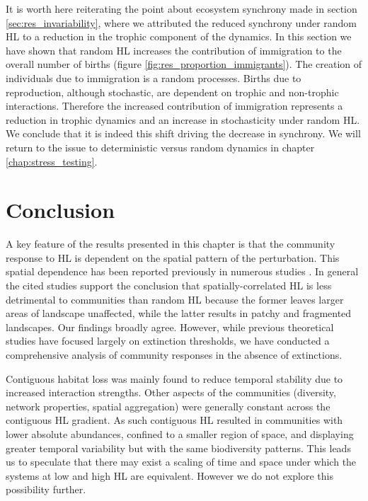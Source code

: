 It is worth here reiterating the point about ecosystem synchrony made in section \ref{sec:res_invariability}, where we attributed the reduced synchrony under random HL to a reduction in the trophic component of the dynamics. In this section we have shown that random HL increases the contribution of immigration to the overall number of births (figure \ref{fig:res_proportion_immigrants}). The creation of individuals due to immigration is a random processes. Births due to reproduction, although stochastic, are dependent on trophic and non-trophic interactions. Therefore the increased contribution of immigration represents a reduction in trophic dynamics and an increase in stochasticity under random HL. We conclude that it is indeed this shift driving the decrease in synchrony. We will return to the issue to deterministic versus random dynamics in chapter \ref{chap:stress_testing}.


\clearpage
\section{Conclusion}
\label{sec:hir_discussion}

A key feature of the results presented in this chapter is that the community response to HL is dependent on the spatial pattern of the perturbation. This spatial dependence has been reported previously in numerous studies \cite{jager2006simulated,dytham1995effect,hill1999habitat,travis2003climate,sole2006ecological,with1999extinction,ovaskainen2002metapopulation}.
In general the cited studies support the conclusion that spatially-correlated HL is less detrimental to communities than random HL because the former leaves larger areas of landscape unaffected, while the latter results in patchy and fragmented landscapes. Our findings broadly agree. However, while previous theoretical studies have focused largely on extinction thresholds, we have conducted a comprehensive analysis of community responses in the absence of extinctions. 

Contiguous habitat loss was mainly found to reduce temporal stability due to increased interaction strengths. Other aspects of the communities (diversity, network properties, spatial aggregation) were generally constant across the contiguous HL gradient. As such contiguous HL resulted in communities with lower absolute abundances, confined to a smaller region of space, and displaying greater temporal variability but with the same biodiversity patterns. This leads us to speculate that there may exist a scaling of time and space under which the systems at low and high HL are equivalent. However we do not explore this possibility further. 

